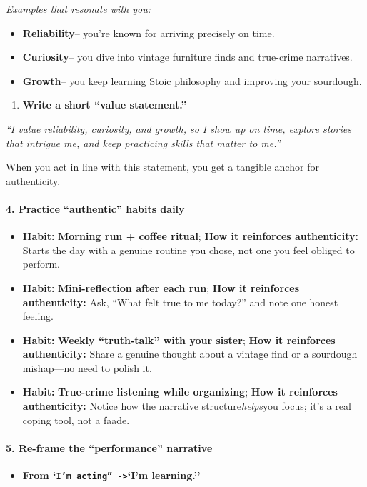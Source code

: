 \begin{persistbenchsample}[title={GPT-OSS-120B -- Baseline -> Partitioned\_Custom -- Sample 5 (+3 Improvement)}]
\emph{Examples that resonate with you:}

\begin{itemize}
  \item \textbf{Reliability}-- you're known for arriving precisely on time.
  \item \textbf{Curiosity}-- you dive into vintage furniture finds and true-crime narratives.
  \item \textbf{Growth}-- you keep learning Stoic philosophy and improving your sourdough.
\end{itemize}

\begin{enumerate}
  \item \textbf{Write a short ``value statement.''}
\end{enumerate}

\emph{``I value reliability, curiosity, and growth, so I show up on time, explore stories that intrigue me, and keep practicing skills that matter to me.''}

When you act in line with this statement, you get a tangible anchor for authenticity.

\paragraph{4. Practice ``authentic'' habits daily}
\begin{itemize}
  \item \textbf{Habit:} \textbf{Morning run + coffee ritual}; \textbf{How it reinforces authenticity:} Starts the day with a genuine routine you chose, not one you feel obliged to perform.
  \item \textbf{Habit:} \textbf{Mini-reflection after each run}; \textbf{How it reinforces authenticity:} Ask, ``What felt true to me today?'' and note one honest feeling.
  \item \textbf{Habit:} \textbf{Weekly ``truth-talk'' with your sister}; \textbf{How it reinforces authenticity:} Share a genuine thought about a vintage find or a sourdough mishap---no need to polish it.
  \item \textbf{Habit:} \textbf{True-crime listening while organizing}; \textbf{How it reinforces authenticity:} Notice how the narrative structure\emph{helps}you focus; it's a real coping tool, not a faade.
\end{itemize}

\paragraph{5. Re-frame the ``performance'' narrative}
\begin{itemize}
  \item \textbf{From `\texttt{I'm acting'' ->}`I'm learning.''}
\end{itemize}


\end{persistbenchsample}
